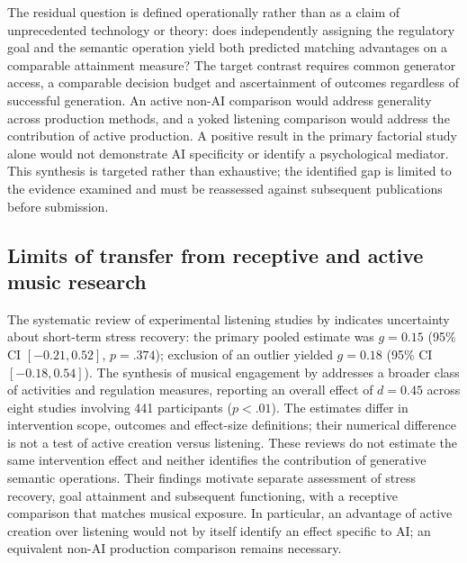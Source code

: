 The residual question is defined operationally rather than as a claim of unprecedented technology or theory: does independently assigning the regulatory goal and the semantic operation yield both predicted matching advantages on a comparable attainment measure? The target contrast requires common generator access, a comparable decision budget and ascertainment of outcomes regardless of successful generation. An active non-AI comparison would address generality across production methods, and a yoked listening comparison would address the contribution of active production. A positive result in the primary factorial study alone would not demonstrate AI specificity or identify a psychological mediator. This synthesis is targeted rather than exhaustive; the identified gap is limited to the evidence examined and must be reassessed against subsequent publications before submission.

\subsection{Limits of transfer from receptive and active music research}
The systematic review of experimental listening studies by \citet{adiasto2022} indicates uncertainty about short-term stress recovery: the primary pooled estimate was $g=0.15$ (95\% CI $[-0.21,0.52]$, $p=.374$); exclusion of an outlier yielded $g=0.18$ (95\% CI $[-0.18,0.54]$). The synthesis of musical engagement by \citet{peters2024} addresses a broader class of activities and regulation measures, reporting an overall effect of $d=0.45$ across eight studies involving 441 participants ($p<.01$). The estimates differ in intervention scope, outcomes and effect-size definitions; their numerical difference is not a test of active creation versus listening. These reviews do not estimate the same intervention effect and neither identifies the contribution of generative semantic operations. Their findings motivate separate assessment of stress recovery, goal attainment and subsequent functioning, with a receptive comparison that matches musical exposure. In particular, an advantage of active creation over listening would not by itself identify an effect specific to AI; an equivalent non-AI production comparison remains necessary.
